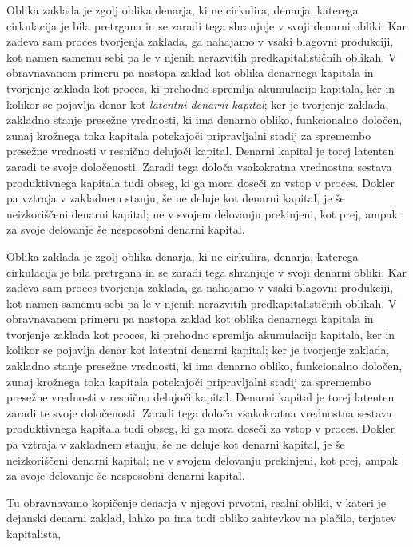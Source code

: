 \documentclass[kapital_02.tex]{subfiles}
\begin{document}
Oblika zaklada je zgolj oblika denarja, ki ne cirkulira, denarja, katerega cirkulacija je bila pretrgana in se zaradi tega shranjuje v svoji denarni obliki. Kar zadeva sam proces tvorjenja zaklada, ga nahajamo v vsaki blagovni produkciji, kot namen samemu sebi pa le v njenih nerazvitih predkapitalističnih oblikah. V obravnavanem primeru pa nastopa zaklad kot oblika denarnega kapitala in tvorjenje zaklada kot proces, ki prehodno spremlja akumulacijo kapitala, ker in kolikor se pojavlja denar kot \emph{latentni denarni kapital}; ker je tvorjenje zaklada, zakladno stanje presežne vrednosti, ki ima denarno obliko, funkcionalno določen, zunaj krožnega toka kapitala potekajoči pripravljalni stadij za spremembo presežne vrednosti v resnično delujoči kapital. Denarni kapital je torej latenten zaradi te svoje določenosti. Zaradi tega določa vsakokratna vrednostna sestava produktivnega kapitala tudi obseg, ki ga mora doseči za vstop v proces. Dokler pa vztraja v zakladnem stanju, še ne deluje kot denarni kapital, je še neizkoriščeni denarni kapital; ne v svojem delovanju prekinjeni, kot prej, ampak za svoje delovanje še nesposobni denarni kapital.

Oblika zaklada je zgolj oblika denarja, ki ne cirkulira, denarja, katerega cirkulacija je bila pretrgana in se zaradi tega shranjuje v svoji denarni obliki. Kar zadeva sam proces tvorjenja zaklada, ga nahajamo v vsaki blagovni produkciji, kot namen samemu sebi pa le v njenih nerazvitih predkapitalističnih oblikah. V obravnavanem primeru pa nastopa zaklad kot oblika denarnega kapitala in tvorjenje zaklada kot proces, ki prehodno spremlja akumulacijo kapitala, ker in kolikor se pojavlja denar kot latentni denarni kapital; ker je tvorjenje zaklada, zakladno stanje presežne vrednosti, ki ima denarno obliko, funkcionalno določen, zunaj krožnega toka kapitala potekajoči pripravljalni stadij za spremembo presežne vrednosti v resnično delujoči kapital. Denarni kapital je torej latenten zaradi te svoje določenosti. Zaradi tega določa vsakokratna vrednostna sestava produktivnega kapitala tudi obseg, ki ga mora doseči za vstop v proces. Dokler pa vztraja v zakladnem stanju, še ne deluje kot denarni kapital, je še neizkoriščeni denarni kapital; ne v svojem delovanju prekinjeni, kot prej, ampak za svoje delovanje še nesposobni denarni kapital.

Tu obravnavamo kopičenje denarja v njegovi prvotni, realni obliki, v kateri je dejanski denarni zaklad, lahko pa ima tudi obliko zahtevkov na plačilo, terjatev kapitalista,
\end{document}
